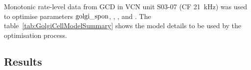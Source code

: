 \medskip{}

Monotonic rate-level data from GCD in VCN \citep{GhoshalKim:1996} unit
S03-07 (CF 21~kHz) was used to optimise parameters ${\rm
golgi\_spon}$, \wLSRGLG, \wHSRGLG, and \sANFGLG\@.  The table~\ref{tab:GolgiCellModelSummary}
shows the model details to be used by the optimisation process. 










\subsection{Results}



